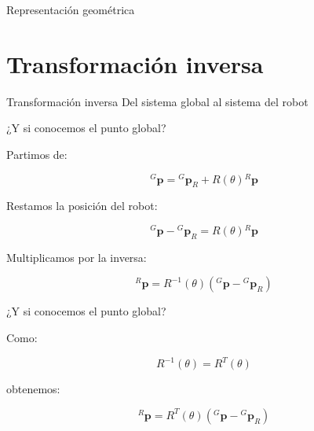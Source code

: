 \documentclass[aspectratio=169]{beamer}
\begin{document}
\begin{frame}{Representación geométrica}
\begin{center}
    \end{center}

\end{frame}

\section{Transformación inversa}

\SectionSlide
{Transformación inversa}
{Del sistema global al sistema del robot}

\begin{frame}{¿Y si conocemos el punto global?}

    Partimos de:

    \[
    {}^{G}\mathbf{p}
    =
    {}^{G}\mathbf{p}_R
    +
    R(\theta)
    {}^{R}\mathbf{p}
    \]

    Restamos la posición del robot:

    \[
    {}^{G}\mathbf{p}
    -
    {}^{G}\mathbf{p}_R
    =
    R(\theta)
    {}^{R}\mathbf{p}
    \]

    Multiplicamos por la inversa:

    \[
    {}^{R}\mathbf{p}
    =
    R^{-1}(\theta)
    \left(
    {}^{G}\mathbf{p}
    -
    {}^{G}\mathbf{p}_R
    \right)
    \]

\end{frame}

\begin{frame}{¿Y si conocemos el punto global?}

    Como:

    \[
    R^{-1}(\theta)=R^T(\theta)
    \]

    obtenemos:

    \[
    \boxed{
        {}^{R}\mathbf{p}
        =
        R^T(\theta)
        \left(
        {}^{G}\mathbf{p}
        -
        {}^{G}\mathbf{p}_R
        \right)}
    \]

    \vspace{0.3cm}


\end{frame}
\end{document}
